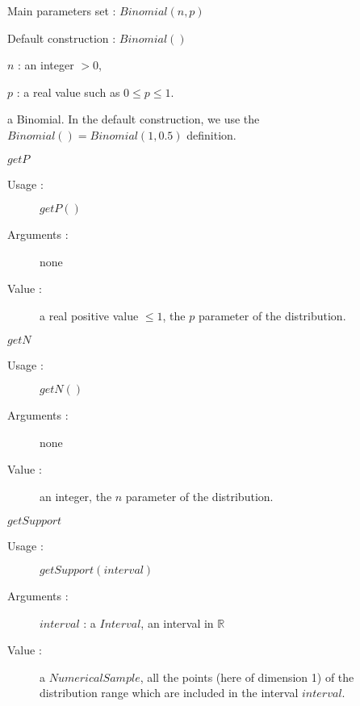 \begin{description}

\item[Usage :]\rule{0pt}{1em}
  \begin{description}
  \item Main parameters set : $Binomial(n,p)$
  \item  Default construction : $Binomial()$
  \end{description}

\item[Arguments :]  \rule{0pt}{1em}
  \begin{description}
  \item $n$ : an integer $>0$,
  \item  $p$ : a real value such as $0\leq p\leq 1$.
  \end{description}

\item[Value :] a Binomial. In the default construction, we use the $Binomial() = Binomial(1,0.5)$ definition.

\item[Some methods :] \rule{0pt}{1em}
  \begin{description}

  \item $getP$
    \begin{description}
    \item[Usage :] $getP()$
    \item[Arguments :] none
    \item[Value :]  a real positive value $\leq 1$, the $p$ parameter of the  distribution.
    \end{description}
    \bigskip

  \item $getN$
    \begin{description}
    \item[Usage :] $getN()$
    \item[Arguments :] none
    \item[Value :]  an integer, the $n$ parameter of the  distribution.
    \end{description}
    \bigskip

  \item $getSupport$
    \begin{description}
    \item[Usage :] $getSupport(interval)$
    \item[Arguments :] $interval$ : a $Interval$, an interval in $\mathbb{R}$
    \item[Value :]  a $NumericalSample$, all the points (here of dimension 1) of the distribution range which are included in the interval $interval$.
    \end{description}


\end{description}
\end{description}
